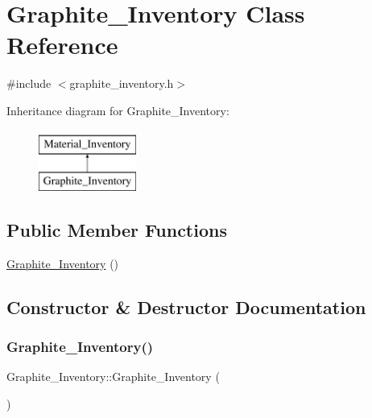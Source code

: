 \hypertarget{classGraphite__Inventory}{}\section{Graphite\+\_\+\+Inventory Class Reference}
\label{classGraphite__Inventory}


{\ttfamily \#include $<$graphite\+\_\+inventory.\+h$>$}

Inheritance diagram for Graphite\+\_\+\+Inventory\+:\begin{figure}[H]
\begin{center}
\leavevmode
\includegraphics[height=2.000000cm]{classGraphite__Inventory}
\end{center}
\end{figure}
\subsection*{Public Member Functions}
\begin{DoxyCompactItemize}
\item 
\hyperlink{classGraphite__Inventory_aee64464327d4c5d6eb37d293fa83b5a6}{Graphite\+\_\+\+Inventory} ()
\end{DoxyCompactItemize}


\subsection{Constructor \& Destructor Documentation}
\mbox{\label{classGraphite__Inventory_aee64464327d4c5d6eb37d293fa83b5a6}} 
\subsubsection{\texorpdfstring{Graphite\+\_\+\+Inventory()}{Graphite\_Inventory()}}
{\footnotesize\ttfamily Graphite\+\_\+\+Inventory\+::\+Graphite\+\_\+\+Inventory (\begin{DoxyParamCaption}{ }\end{DoxyParamCaption})}



